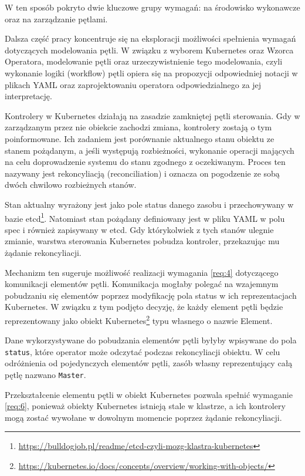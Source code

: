 W ten sposób pokryto dwie kluczowe grupy wymagań: na środowisko wykonawcze oraz na zarządzanie pętlami.

Dalsza część pracy koncentruje się na eksploracji możliwości spełnienia wymagań dotyczących modelowania pętli. W związku z wyborem Kubernetes oraz Wzorca Operatora, modelowanie pętli oraz urzeczywistnienie tego modelowania, czyli wykonanie logiki (workflow) pętli opiera się na propozycji odpowiedniej notacji w plikach YAML oraz zaprojektowaniu operatora odpowiedzialnego za jej interpretację.

Kontrolery w Kubernetes działają na zasadzie zamkniętej pętli sterowania. Gdy w zarządzanym przez nie obiekcie zachodzi zmiana, kontrolery zostają o tym poinformowane. Ich zadaniem jest porównanie aktualnego stanu obiektu ze stanem pożądanym, a jeśli występują rozbieżności, wykonanie operacji mających na celu doprowadzenie systemu do stanu zgodnego z oczekiwanym. Proces ten nazywany jest rekoncyliacją (reconciliation) i oznacza on pogodzenie ze sobą dwóch chwilowo rozbieżnych stanów.

Stan aktualny wyrażony jest jako pole status danego zasobu i przechowywany w bazie etcd\footnote{\url{https://bulldogjob.pl/readme/etcd-czyli-mozg-klastra-kubernetes}}. Natomiast stan pożądany definiowany jest w pliku YAML w polu spec i również zapisywany w etcd. Gdy którykolwiek z tych stanów ulegnie zmianie, warstwa sterowania Kubernetes pobudza kontroler, przekazując mu żądanie rekoncyliacji.

Mechanizm ten sugeruje możliwość realizacji wymagania \ref{req:4} dotyczącego komunikacji elementów pętli. Komunikacja mogłaby polegać na wzajemnym pobudzaniu się elementów poprzez modyfikację pola status w ich reprezentacjach Kubernetes. W związku z tym podjęto decyzję, że każdy element pętli będzie reprezentowany jako obiekt Kubernetes\footnote{\url{https://kubernetes.io/docs/concepts/overview/working-with-objects/}} typu własnego o nazwie Element.

Dane wykorzystywane do pobudzania elementów pętli byłyby wpisywane do pola \texttt{status}, które operator może odczytać podczas rekoncyliacji obiektu. W celu odróżnienia od pojedynczych elementów pętli, zasób własny reprezentujący całą pętlę nazwano \texttt{Master}.

Przekształcenie elementu pętli w obiekt Kubernetes pozwala spełnić wymaganie \ref{req:6}, ponieważ obiekty Kubernetes istnieją stale w klastrze, a ich kontrolery mogą zostać wywołane w dowolnym momencie poprzez żądanie rekoncyliacji.

